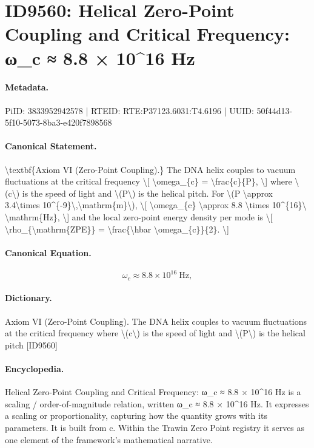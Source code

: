 \section*{ID9560: Helical Zero-Point Coupling and Critical Frequency: ω\_c ≈ 8.8 × 10\textasciicircum{}16 Hz}
\paragraph{Metadata.}
PiID: 3833952942578 | RTEID: RTE:P37123.6031:T4.6196 | UUID: 50f44d13-5f10-5073-8ba3-e420f7898568

\paragraph{Canonical Statement.}
\textbackslash{}textbf\{Axiom VI (Zero-Point Coupling).\} The DNA helix couples to vacuum fluctuations at the critical frequency \textbackslash{}[ \textbackslash{}omega\_\{c\} = \textbackslash{}frac\{c\}\{P\}, \textbackslash{}] where \textbackslash{}(c\textbackslash{}) is the speed of light and \textbackslash{}(P\textbackslash{}) is the helical pitch. For \textbackslash{}(P \textbackslash{}approx 3.4\textbackslash{}times 10\textasciicircum{}\{-9\}\textbackslash{},\textbackslash{}mathrm\{m\}\textbackslash{}), \textbackslash{}[ \textbackslash{}omega\_\{c\} \textbackslash{}approx 8.8 \textbackslash{}times 10\textasciicircum{}\{16\}\textbackslash{} \textbackslash{}mathrm\{Hz\}, \textbackslash{}] and the local zero-point energy density per mode is \textbackslash{}[ \textbackslash{}rho\_\{\textbackslash{}mathrm\{ZPE\}\} = \textbackslash{}frac\{\textbackslash{}hbar \textbackslash{}omega\_\{c\}\}\{2\}. \textbackslash{}]

\paragraph{Canonical Equation.}
\[
\omega_{c} \approx 8.8 \times 10^{16}\ \mathrm{Hz},
\]

\paragraph{Dictionary.}
Axiom VI (Zero-Point Coupling). The DNA helix couples to vacuum fluctuations at the critical frequency where \textbackslash{}(c\textbackslash{}) is the speed of light and \textbackslash{}(P\textbackslash{}) is the helical pitch [ID9560]

\paragraph{Encyclopedia.}
Helical Zero-Point Coupling and Critical Frequency: ω\_c ≈ 8.8 × 10\textasciicircum{}16 Hz is a scaling / order-of-magnitude relation, written ω\_c ≈ 8.8 × 10\textasciicircum{}16 Hz. It expresses a scaling or proportionality, capturing how the quantity grows with its parameters. It is built from c. Within the Trawin Zero Point registry it serves as one element of the framework's mathematical narrative.

